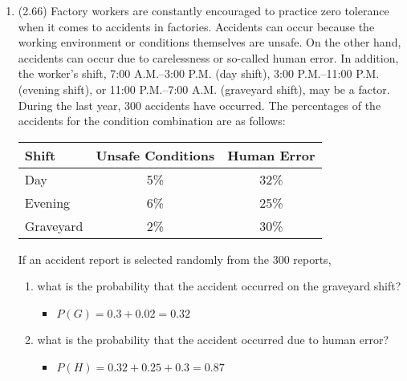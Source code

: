 \documentclass[basic, header]{nosvagor-notes} \usepackage{nosvagor-math}
\begin{document}
\begin{enumerate}[itemsep=8em]
\begin{enumerate}
\begin{itemize}
        \end{itemize}

    \end{enumerate}

  \item (2.66) Factory workers are constantly encouraged to practice zero
    tolerance when it comes to accidents in factories. Accidents can occur
    because the working environment or conditions themselves are unsafe. On
    the other hand, accidents can occur due to carelessness or so-called human
    error. In addition, the worker’s shift, 7:00 A.M.--3:00 P.M. (day shift),
    3:00 P.M.--11:00 P.M. (evening shift), or 11:00 P.M.--7:00 A.M. (graveyard
    shift), may be a factor. During the last year, 300 accidents have
    occurred. The percentages of the accidents for the condition combination
    are as follows:
    \begin{table}[h]
      \centering
      \begin{tabular}{lcc}
        \toprule
         Shift      & Unsafe Conditions & Human Error \\
        \midrule
          Day       &               5\% & 32\%        \\
          Evening   &               6\% & 25\%        \\
          Graveyard &               2\% & 30\%        \\
        \bottomrule
      \end{tabular}
    \end{table}

    If an accident report is selected randomly from the 300 reports,
    \begin{enumerate}

     \item what is the probability that the accident occurred on the
     graveyard shift?
     \begin{itemize}
       \item \(P(G) = 0.3 + 0.02 = 0.32\)

     \end{itemize}

     \item what is the probability that the accident occurred
     due to human error?
     \begin{itemize}
       \item \(P(H) = 0.32 + 0.25 + 0.3 = 0.87\)

     \end{itemize}


\end{enumerate}
\end{enumerate}
\end{document}
